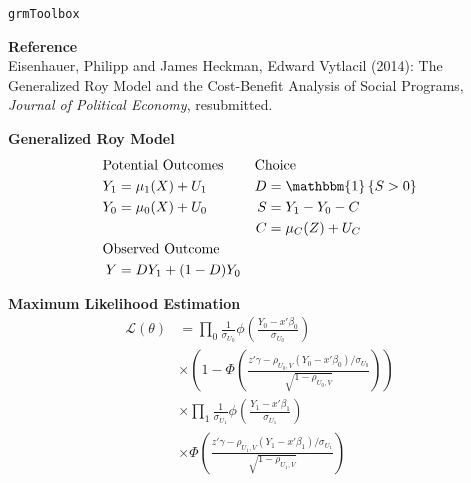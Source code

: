 \begin{frame}[fragile]
\begin{center}\huge
\verb+grmToolbox+
\end{center}
\end{frame}


\begin{frame}\begin{center}
	
	\textbf{Reference}\\\vspace{0.3cm}
    Eisenhauer, Philipp and James Heckman, Edward Vytlacil (2014): The Generalized Roy Model and the Cost-Benefit Analysis of Social Programs, \textit{Journal of Political Economy}, resubmitted.
    \end{center}
\end{frame}

\begin{frame}
\textbf{Generalized Roy Model}
\begin{align*}
\mc{2}{l}{\text{Potential Outcomes}}  &\mc{2}{l}{\text{Choice}}\\
Y_1 & = \mu_1{(X)} + U_1 		& D & = \mathbbm{1}\left\{ S > 0 \right\}\\
Y_0 & = \mu_0{(X)} + U_0 		& S & = Y_1 - Y_0 - C\\
		&& C & = \mu_C(Z) + U_C\\
\mc{2}{l}{\text{Observed Outcome}}  	&   & \\
Y   & = D Y_1 + (1 - D)Y_0	  		    	&   &  \\
\end{align*}
\end{frame}

\begin{frame}
\textbf{Maximum Likelihood Estimation}\vspace{0.5cm}
\begin{align*}
\mathcal{L(\theta)}&= \prod_{0} \frac{1}{\sigma_{U_0}} \phi \left( \frac{Y_0  - x'\beta_0}{\sigma_{U_0}}\right)\\
		     & \times\left( 1 - \Phi\left(\frac{z'\gamma - \rho_{U_0,V}(Y_0 - x'\beta_0)/\sigma_{U_0} }{\sqrt{1 - \rho_{U_0,V}}}\right)\right)\\
	& \times\prod_{1} \frac{1}{\sigma_{U_1}} \phi \left( \frac{Y_1  - x'\beta_1}{\sigma_{U_1}}\right)\\
		     & \times\Phi\left(\frac{z'\gamma - \rho_{U_1,V}(Y_1 - x'\beta_1)/\sigma_{U_1} }{\sqrt{1 - \rho_{U_1,V}}}\right)\\
\end{align*}
\end{frame}

